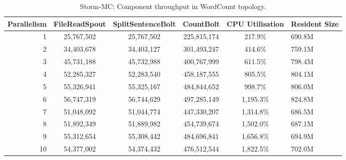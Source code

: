\documentclass[bsc,deptreport,twoside,singlespacing,normalheadings,parskip]{infthesis}\usepackage[]{graphicx}\usepackage[]{color}
\begin{document}
\begin{table}[!htb]
\begin{adjustwidth}{-0.5in}{-0.5in}
\centering
\small
\begin{tabular}{@{}rccccl@{}}
    \textbf{Parallelism} & \textbf{FileReadSpout} & \textbf{SplitSentenceBolt} & \textbf{CountBolt} & \textbf{CPU Utilisation} & \textbf{Resident Size} \\ \toprule
    1 & {25,767,502} & {25,767,502} & {225,815,174} & {217.9\%} & {690.8M} \\
    2 & {34,403,678} & {34,403,127} & {301,493,247} & {414.6\%} & {759.1M} \\
    3 & {45,731,188} & {45,732,988} & {400,767,999} & {611.5\%} & {798.4M} \\
    4 & {52,285,327} & {52,283,540} & {458,187,555} & {805.5\%} & {804.1M} \\
	5 & {55,326,941} & {55,325,167} & {484,844,652} & {998.7\%} & {806.0M} \\
	6 & {56,747,319} & {56,744,629} & {497,285,149} & {1,195.3\%} & {824.8M} \\
	7 & {51,048,092} & {51,044,774} & {447,330,207} & {1,314.8\%} & {686.5M} \\
	8 & {51,892,349} & {51,889,982} & {454,739,674} & {1,502.0\%} & {687.1M} \\
	9 & {55,312,654} & {55,308,442} & {484,696,841} & {1,656.8\%} & {694.9M} \\
	10 & {54,377,002} & {54,374,432} & {476,512,544} & {1,822.5\%} & {702.0M} \\
\end{tabular}
\caption{Storm-MC: Component throughput in WordCount topology.}
\label{table:storm_mc_wordcount}
\end{adjustwidth}
\end{table}
\end{document}
